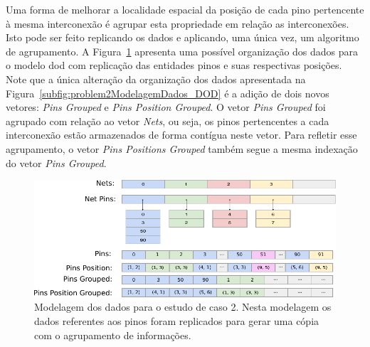 


Uma forma de melhorar a localidade espacial da posição de cada pino pertencente à mesma interconexão é agrupar esta propriedade em relação as interconexões.
Isto pode ser feito replicando os dados e aplicando, uma única vez, um algoritmo de agrupamento. 
A Figura~\ref{fig:problem2Modelagem_DOD_grouped} apresenta uma possível organização dos dados para o modelo \ac{dod} com replicação das entidades pinos e suas respectivas posições. 
Note que a única alteração da organização dos dados apresentada na Figura~\ref{subfig:problem2ModelagemDados_DOD} é a adição de dois novos vetores: \textit{Pins Grouped} e \textit{Pins Position Grouped}.
O vetor \textit{Pins Grouped} foi agrupado com relação ao vetor \textit{Nets}, ou seja, os pinos pertencentes a cada interconexão estão armazenados de forma contígua neste vetor. Para refletir esse agrupamento, o vetor \textit{Pins Positions Grouped} também segue a mesma indexação do vetor \textit{Pins Grouped}.

\begin{figure}
    \centering
    \includegraphics[width=\linewidth]{img/results/problem2/estimativa_interconection_dod_grouped.pdf}
    \caption[Agrupamento dos dados para o estudo de caso 2]{Modelagem dos dados para o estudo de caso 2. Nesta modelagem os dados referentes aos pinos foram replicados para gerar uma cópia com o agrupamento de informações.}
    \label{fig:problem2Modelagem_DOD_grouped}
\end{figure}


